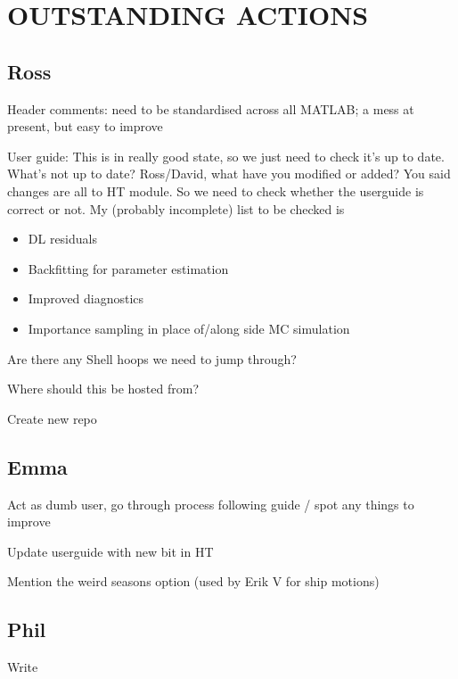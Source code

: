 \documentclass[a4paper,fleqn]{cas-sc} %
\begin{document}
\section*{OUTSTANDING ACTIONS}

\subsection*{Ross}
\par Header comments: need to be standardised across all MATLAB; a mess at present, but easy to improve
\par User guide: This is in really good state, so we just need to check it's up to date. What's not up to date? Ross/David, what have you modified or added? You said changes are all to HT module. So we need to check whether the userguide is correct or not. My (probably incomplete) list to be checked is
\begin{itemize}
	\item DL residuals
	\item  Backfitting for parameter estimation
	\item  Improved diagnostics 
	\item  Importance sampling in place of/along side MC simulation
\end{itemize}
\par Are there any Shell hoops we need to jump through?
\par Where should this be hosted from?
\par Create new repo
\\

\subsection*{Emma}

\par Act as dumb user, go through process following guide / spot any things to improve

\par Update userguide with new bit in HT

\par Mention the weird seasons option (used by Erik V for ship motions)

\subsection*{Phil}

\par Write
\end{document}
